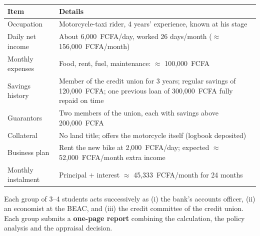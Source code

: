 \documentclass[11pt]{article}
\newcounter{popsec}
\newcounter{popsub}
\newcommand{\courssub}[1]{%
  \stepcounter{popsub}%
  \par\vspace{9pt}\noindent{\popxbold\fontsize{11.5}{13}\selectfont\color{popink}{\color{poporange}\thepopsec.\thepopsub}\hspace{6pt}#1}\par\nopagebreak\vspace{4pt}
}
\begin{document}
\begin{center}
\begin{tabularx}{\linewidth}{|l|X|}
\hline
\rowcolor{popblueL} \textbf{Item} & \textbf{Details} \\
\hline
Occupation & Motorcycle-taxi rider, 4 years' experience, known at his stage \\
\hline
Daily net income & About 6,000~FCFA/day, worked 26 days/month ($\approx$ 156,000~FCFA/month) \\
\hline
Monthly expenses & Food, rent, fuel, maintenance: $\approx$ 100,000~FCFA \\
\hline
Savings history & Member of the credit union for 3 years; regular savings of 120,000~FCFA; one previous loan of 300,000~FCFA fully repaid on time \\
\hline
Guarantors & Two members of the union, each with savings above 200,000~FCFA \\
\hline
Collateral & No land title; offers the motorcycle itself (logbook deposited) \\
\hline
Business plan & Rent the new bike at 2,000~FCFA/day; expected $\approx$ 52,000~FCFA/month extra income \\
\hline
Monthly instalment & Principal $+$ interest $\approx$ 45,333~FCFA/month for 24 months \\
\hline
\end{tabularx}
\end{center}

Each group of 3--4 students acts successively as (i) the bank's accounts officer, (ii) an economist at the BEAC, and (iii) the credit committee of the credit union. Each group submits a \textbf{one-page report} combining the calculation, the policy analysis and the appraisal decision.

\courssub{Tasks}
\end{document}
